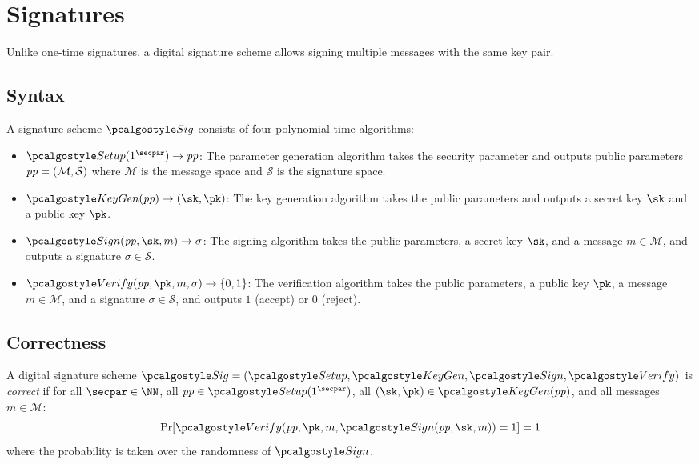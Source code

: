 \section{Signatures}\label{sec:signatures}

 Unlike one-time signatures, a digital signature scheme allows signing multiple messages with the same key pair.

\subsection{Syntax}

\begin{definition}
  A signature scheme $\algo{Sig}$ consists of four polynomial-time algorithms:
  \begin{itemize}
    \item $\algo{Setup}(1^\secpar) \rightarrow \params$: The parameter generation algorithm takes the security parameter and outputs public parameters $\mathit{pp} = (\mathcal{M}, \mathcal{S})$ where $\mathcal{M}$ is the message space and $\mathcal{S}$ is the signature space.
    \item $\algo{KeyGen}(\params) \rightarrow (\sk, \pk)$: The key generation algorithm takes the public parameters and outputs a secret key $\sk$ and a public key $\pk$.
    \item $\algo{Sign}(\params, \sk, m) \rightarrow \sigma$: The signing algorithm takes the public parameters, a secret key $\sk$, and a message $m \in \mathcal{M}$, and outputs a signature $\sigma \in \mathcal{S}$.
    \item $\algo{Verify}(\params, \pk, m, \sigma) \rightarrow \{0, 1\}$: The verification algorithm takes the public parameters, a public key $\pk$, a message $m \in \mathcal{M}$, and a signature $\sigma \in \mathcal{S}$, and outputs $1$ (accept) or $0$ (reject).
  \end{itemize}
\end{definition}

\subsection{Correctness}

\begin{definition}[Correctness]\label{def:sig-correctness}
  A digital signature scheme $\algo{Sig} = (\algo{Setup}, \algo{KeyGen}, \algo{Sign}, \algo{Verify})$ is \emph{correct} if for all $\secpar \in \NN$, all $\params \in \algo{Setup}(1^\secpar)$, all $(\sk, \pk) \in \algo{KeyGen}(\params)$, and all messages $m \in \mathcal{M}$:
  \[
    \Pr[\algo{Verify}(\params, \pk, m, \algo{Sign}(\params, \sk, m)) = 1] = 1
  \]
  where the probability is taken over the randomness of $\algo{Sign}$.
\end{definition}

